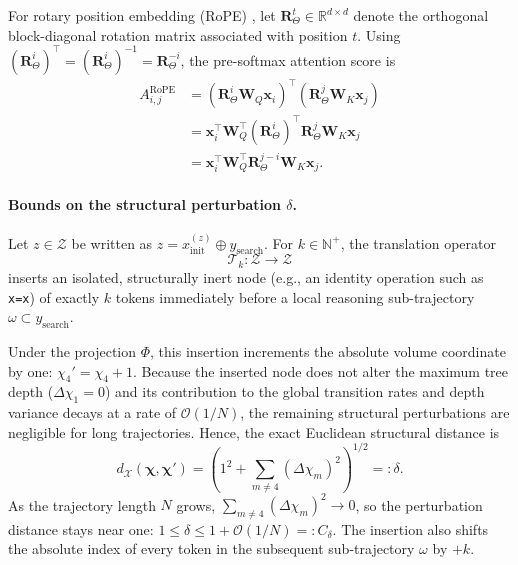 For rotary position embedding (RoPE) \citep{su2023roformerenhancedtransformerrotary}, let $\mathbf{R}_\Theta^t \in \mathbb{R}^{d\times d}$ denote the orthogonal block-diagonal rotation matrix associated with position $t$. Using $(\mathbf{R}_\Theta^i)^\top = (\mathbf{R}_\Theta^i)^{-1} = \mathbf{R}_\Theta^{-i}$, the pre-softmax attention score is
\begin{align}
A_{i,j}^{\mathrm{RoPE}}
&=
(\mathbf{R}_\Theta^i \mathbf{W}_Q \mathbf{x}_i)^\top
(\mathbf{R}_\Theta^j \mathbf{W}_K \mathbf{x}_j) \\
&=
\mathbf{x}_i^\top \mathbf{W}_Q^\top
(\mathbf{R}_\Theta^i)^\top
\mathbf{R}_\Theta^j
\mathbf{W}_K \mathbf{x}_j \\
&=
\mathbf{x}_i^\top \mathbf{W}_Q^\top
\mathbf{R}_\Theta^{j-i}
\mathbf{W}_K \mathbf{x}_j .
\end{align}

\paragraph{Bounds on the structural perturbation $\delta$.}
Let $z \in \mathcal{Z}$ be written as $z = x_{\mathrm{init}}^{(z)} \oplus y_{\mathrm{search}}$. For $k \in \mathbb{N}^+$, the translation operator
\[
\mathcal{T}_k : \mathcal{Z} \to \mathcal{Z}
\]
inserts an isolated, structurally inert node (e.g., an identity operation such as \texttt{x=x}) of exactly $k$ tokens immediately before a local reasoning sub-trajectory $\omega \subset y_{\mathrm{search}}$.

Under the projection $\Phi$, this insertion increments the absolute volume coordinate by one: $\chi_4' = \chi_4 + 1$. Because the inserted node does not alter the maximum tree depth ($\Delta \chi_1 = 0$) and its contribution to the global transition rates and depth variance decays at a rate of $\mathcal{O}(1/N)$, the remaining structural perturbations are negligible for long trajectories. Hence, the exact Euclidean structural distance is
\begin{equation}
    d_{\mathcal{X}}(\boldsymbol{\chi},\boldsymbol{\chi}')
    =
    \left(
    1^2+\sum_{m\neq 4}(\Delta\chi_m)^2
    \right)^{1/2}
    =: \delta.
\end{equation}
As the trajectory length $N$ grows, $\sum_{m\neq 4}(\Delta\chi_m)^2 \to 0$, so the perturbation distance stays near one: $1 \le \delta \le 1 + \mathcal{O}(1/N) =: C_\delta$. The insertion also shifts the absolute index of every token in the subsequent sub-trajectory $\omega$ by $+k$.

